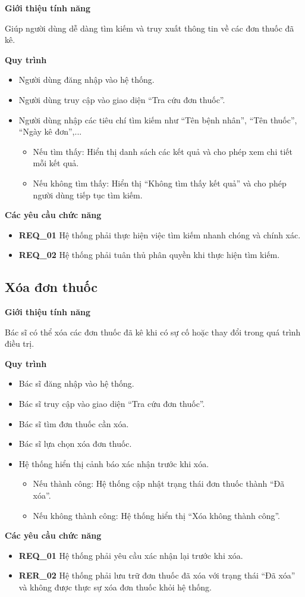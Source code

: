 \noindent \textbf{Giới thiệu tính năng}

Giúp người dùng dễ dàng tìm kiếm và truy xuất thông tin về các đơn thuốc đã kê.

\noindent \textbf{Quy trình}
\begin{itemize}
  \item Người dùng đăng nhập vào hệ thống.
  \item Người dùng truy cập vào giao diện ``Tra cứu đơn thuốc''.
  \item Người dùng nhập các tiêu chí tìm kiếm như ``Tên bệnh nhân'', ``Tên thuốc'', ``Ngày kê đơn'',...
    \begin{itemize}
      \item Nếu tìm thấy: Hiển thị danh sách các kết quả và cho phép xem chi tiết mỗi kết quả.
      \item Nếu không tìm thấy: Hiển thị ``Không tìm thấy kết quả'' và cho phép người dùng tiếp tục tìm kiếm.
    \end{itemize}
\end{itemize}

\noindent \textbf{Các yêu cầu chức năng}
\begin{itemize}
  \item \textbf{REQ\_01} Hệ thống phải thực hiện việc tìm kiếm nhanh chóng và chính xác.
  \item \textbf{REQ\_02} Hệ thống phải tuân thủ phân quyền khi thực hiện tìm kiếm.
\end{itemize}

\subsection{Xóa đơn thuốc}

\noindent \textbf{Giới thiệu tính năng}

Bác sĩ có thể xóa các đơn thuốc đã kê khi có sự cố hoặc thay đổi trong quá trình điều trị.

\noindent \textbf{Quy trình}
\begin{itemize}
  \item Bác sĩ đăng nhập vào hệ thống.
  \item Bác sĩ truy cập vào giao diện ``Tra cứu đơn thuốc''.
  \item Bác sĩ tìm đơn thuốc cần xóa.
  \item Bác sĩ lựa chọn xóa đơn thuốc.
  \item Hệ thống hiển thị cảnh báo xác nhận trước khi xóa.
    \begin{itemize}
      \item Nếu thành công: Hệ thống cập nhật trạng thái đơn thuốc thành ``Đã xóa''.
      \item Nếu không thành công: Hệ thống hiển thị ``Xóa không thành công''.
    \end{itemize}
\end{itemize}

\noindent \textbf{Các yêu cầu chức năng}
\begin{itemize}
  \item \textbf{REQ\_01} Hệ thống phải yêu cầu xác nhận lại trước khi xóa.
  \item \textbf{RER\_02} Hệ thống phải lưu trữ đơn thuốc đã xóa với trạng thái ``Đã xóa'' và không được thực sự xóa đơn thuốc khỏi hệ thống.
\end{itemize}
